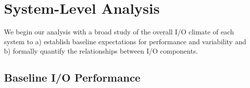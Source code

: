 \section{System-Level Analysis} \label{sec:results}

We begin our analysis with a broad study of the overall I/O climate of each system to
a) establish baseline expectations for performance and variability and b) formally quantify the relationships between I/O components.
%

\subsection{Baseline I/O Performance} \label{sec:results/overview}



